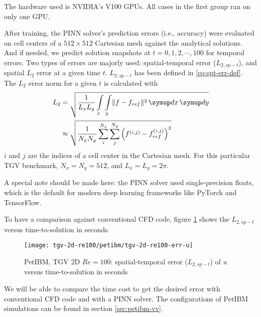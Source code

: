 The hardware used is NVIDIA's V100 GPUs.
All cases in the first group ran on only one GPU.

After training, the PINN solver's prediction errors (i.e., accuracy) were evaluated on cell centers of a $512 \times 512$ Cartesian mesh against the analytical solutions.
And if needed, we predict solution snapshots at $t=0, 1, 2, \cdots, 100$ for temporal errors.
Two types of errors are majorly used: spatial-temporal error ($L_{2,sp-t}$), and spatial $L_2$ error at a given time $t$.
$L_{2,sp-t}$ has been defined in \eqref{eq:spt-err-def}.
The $L_2$ error norm for a given $t$ is calculated with
\begin{equation}\label{eq:l2norm}
    \begin{aligned}
        L_2
        &=
        \sqrt{
            \frac{1}{L_x L_y}
            \int\limits_{x}\int\limits_{y} \lVert f - f_{ref}\rVert^2
            \diff x \diff y
        } \\
        &\approx
        \sqrt{
            \frac{1}{N_x N_y}
            \sum\limits_{i}^{N_x}\sum\limits_{j}^{N_y}
            \left(f^{\left(i, j\right)}-f_{ref}^{\left(i, j\right)}\right)^2
        }
    \end{aligned}
\end{equation}
$i$ and $j$ are the indices of a cell center in the Cartesian mesh.
For this particular TGV benchmark, $N_x=N_y=512$, and $L_x=L_y=2\pi$.

A special note should be made here: the PINN solver used single-precision floats, which is the default for modern deep learning frameworks like PyTorch and TensorFlow.

To have a comparison against conventional CFD code, figure \ref{fig:petibm-tgv-spatial-temporal-error} shows the $L_{2,sp-t}$ versus time-to-solution in seconds.
\begin{figure}[hbt!]
    \centering%
    \texttt{[image: tgv-2d-re100/petibm/tgv-2d-re100-err-u]}%
    \caption[%
        PetIBM, TGV 2D $Re=100$: spatial-temporal error ($L_{2,sp-t}$) of $u$%
    ]{%
        PetIBM, TGV 2D $Re=100$: spatial-temporal error ($L_{2,sp-t}$)  of $u$ versus time-to-solution in seconds%
    }\label{fig:petibm-tgv-spatial-temporal-error}%
\end{figure}
We will be able to compare the time cost to get the desired error with conventional CFD code and with a PINN solver.
The configurations of PetIBM simulations can be found in section \ref{sec:petibm-vv}.
